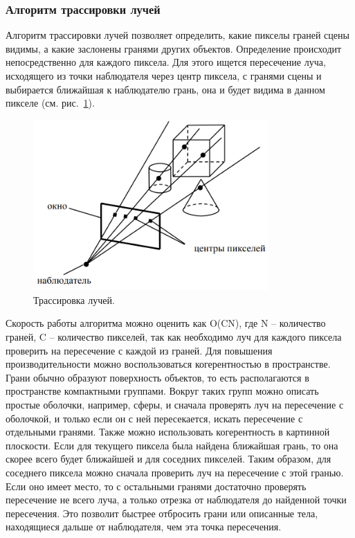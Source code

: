 \subsubsection{Алгоритм трассировки лучей}

\hspace{1.25cm}
Алгоритм трассировки лучей позволяет определить, какие пикселы граней сцены видимы, а какие заслонены гранями других объектов. Определение происходит непосредственно для каждого пиксела. Для этого ищется пересечение луча, исходящего из точки наблюдателя через центр пиксела, с гранями сцены и выбирается ближайшая к наблюдателю грань, она и будет видима в данном пикселе (см. рис.~\ref{fig:ray_tracing_algorithm_1}).

\begin{figure}[H]
    \centering
    \includegraphics[width=0.8\textwidth]{img/ray_tracing_algorithm_1.png}
    \caption{Трассировка лучей.}
    \label{fig:ray_tracing_algorithm_1}
\end{figure}

Скорость работы алгоритма можно оценить как O(CN), где N – количество граней, C – количество пикселей, так как необходимо луч для каждого пиксела проверить на пересечение с каждой из граней. Для повышения производительности можно воспользоваться когерентностью в пространстве. Грани обычно образуют поверхность объектов, то есть располагаются в пространстве компактными группами. Вокруг таких групп можно описать простые оболочки, например, сферы, и сначала проверять луч на пересечение с оболочкой, и только если он с ней пересекается, искать пересечение с отдельными гранями. Также можно использовать когерентность в картинной плоскости. Если для текущего пиксела была найдена ближайшая грань, то она скорее всего будет ближайшей и для соседних пикселей. Таким образом, для соседнего пиксела можно сначала проверить луч на пересечение с этой гранью. Если оно имеет место, то с остальными гранями достаточно проверять пересечение не всего луча, а только отрезка от наблюдателя до найденной точки пересечения. Это позволит быстрее отбросить грани или описанные тела, находящиеся дальше от наблюдателя, чем эта точка пересечения.~\cite{polski}


